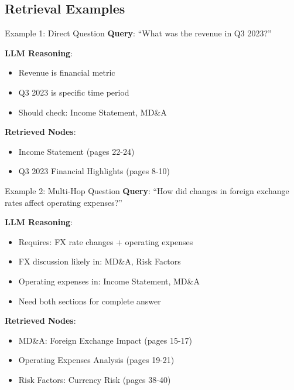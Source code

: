 \subsection{Retrieval Examples}

\begin{examplebox}{Example 1: Direct Question}
\textbf{Query}: ``What was the revenue in Q3 2023?''

\textbf{LLM Reasoning}:
\begin{itemize}
    \item Revenue is financial metric
    \item Q3 2023 is specific time period
    \item Should check: Income Statement, MD\&A
\end{itemize}

\textbf{Retrieved Nodes}:
\begin{itemize}
    \item [node\_0015] Income Statement (pages 22-24)
    \item [node\_0018] Q3 2023 Financial Highlights (pages 8-10)
\end{itemize}
\end{examplebox}

\begin{examplebox}{Example 2: Multi-Hop Question}
\textbf{Query}: ``How did changes in foreign exchange rates affect operating expenses?''

\textbf{LLM Reasoning}:
\begin{itemize}
    \item Requires: FX rate changes + operating expenses
    \item FX discussion likely in: MD\&A, Risk Factors
    \item Operating expenses in: Income Statement, MD\&A
    \item Need both sections for complete answer
\end{itemize}

\textbf{Retrieved Nodes}:
\begin{itemize}
    \item [node\_0012] MD\&A: Foreign Exchange Impact (pages 15-17)
    \item [node\_0014] Operating Expenses Analysis (pages 19-21)
    \item [node\_0025] Risk Factors: Currency Risk (pages 38-40)
\end{itemize}
\end{examplebox}

